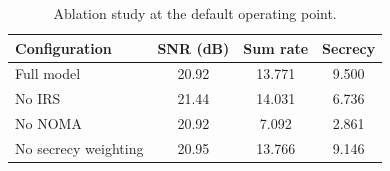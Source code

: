 \begin{table}[t]
\caption{Ablation study at the default operating point.}
\label{tab:ablation}
\centering
\begin{tabular}{lccc}
\hline
Configuration & SNR (dB) & Sum rate & Secrecy \\
\hline
Full model & 20.92 & 13.771 & 9.500 \\
No IRS & 21.44 & 14.031 & 6.736 \\
No NOMA & 20.92 & 7.092 & 2.861 \\
No secrecy weighting & 20.95 & 13.766 & 9.146 \\
\hline
\end{tabular}
\end{table}
